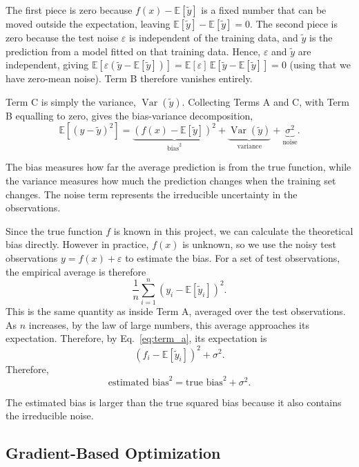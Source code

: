 \documentclass[amssymb,twocolumn,aps]{revtex4}
\begin{document}
The first piece is zero because $f(x)-\mathbb{E}[\tilde{y}]$ is a fixed number that can be moved outside the expectation, leaving $\mathbb{E}[\tilde{y}]-\mathbb{E}[\tilde{y}]=0$. The second piece is zero because the test noise $\varepsilon$ is independent of the training data, and $\tilde{y}$ is the prediction from a model fitted on that training data. Hence, $\varepsilon$ and $\tilde{y}$ are independent, giving $\mathbb{E}[\varepsilon(\tilde{y}-\mathbb{E}[\tilde{y}])]=\mathbb{E}[\varepsilon]\,\mathbb{E}[\tilde{y}-\mathbb{E}[\tilde{y}]]=0$ (using that we have zero-mean noise). Term B therefore vanishes entirely.

Term C is simply the variance, $\operatorname{Var}(\tilde{y})$. Collecting Terms A and C, with Term B equalling to zero, gives the bias-variance decomposition,
\begin{equation}
    \mathbb{E}\left[(y-\tilde{y})^2\right]
    =
    \underbrace{
        \left(f(x)-\mathbb{E}[\tilde{y}]\right)^2
    }_{\text{bias}^2}
    +
    \underbrace{
        \operatorname{Var}(\tilde{y})
    }_{\text{variance}}
    +
    \underbrace{\sigma^2}_{\text{noise}}.
    \label{eq:bias_variance}
\end{equation}

The bias measures how far the average prediction is from the true function, while the variance measures how much the prediction changes when the training set changes. The noise term represents the irreducible uncertainty in the observations.

Since the true function $f$ is known in this project, we can calculate the theoretical bias directly. However in practice, $f(x)$ is unknown, so we use the noisy test observations $y=f(x)+\varepsilon$ to estimate the bias. For a set of test observations, the empirical average is therefore
\[
    \frac{1}{n}\sum_{i=1}^n
    \left(y_{i}-\mathbb{E}[\tilde{y}_i]\right)^2.
\]
This is the same quantity as inside Term A, averaged over the test observations. As $n$ increases, by the law of large numbers, this average approaches its expectation. Therefore, by Eq.~\eqref{eq:term_a}, its expectation is
\[
    \left(f_i-\mathbb{E}[\tilde{y}_i]\right)^2+\sigma^2.
\]
Therefore,
\[
    \text{estimated bias}^2
    =
    \text{true bias}^2+\sigma^2.
\]

The estimated bias is larger than the true squared bias because it also contains the irreducible noise.

\subsection{Gradient-Based Optimization}\label{subsection:gradient}
\end{document}
